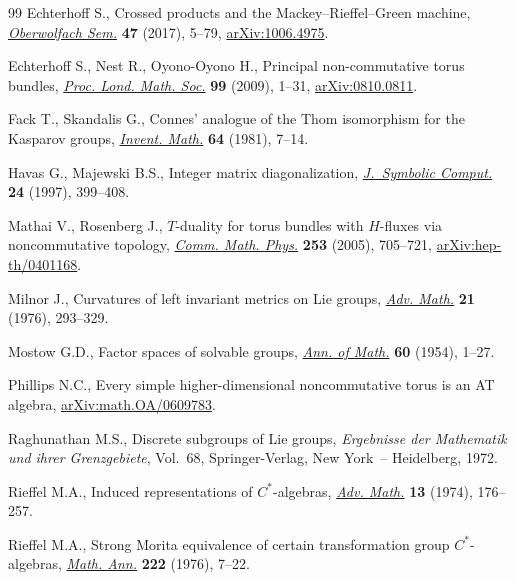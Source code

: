 \documentclass[11pt]{article}
\numberwithin{equation}{section}
\numberwithin{equation}{section}
\begin{document}
\begin{thebibliography}{99}
Echterhoff S., Crossed products and the Mackey--Rieffel--Green machine,
 \href{https://doi.org/10.1088/1126-6708/2003/09/054}{\textit{Oberwolfach Sem.}} \textbf{47} (2017), 5--79, \href{https://arxiv.org/abs/1006.4975}{arXiv:1006.4975}.

Echterhoff S., Nest R., Oyono-Oyono H., Principal non-commutative torus
 bundles, \href{https://doi.org/10.1112/plms/pdn050}{\textit{Proc. Lond. Math. Soc.}} \textbf{99} (2009), 1--31,
 \href{https://arxiv.org/abs/#2}{arXiv:0810.0811}.

Fack T., Skandalis G., Connes' analogue of the {T}hom isomorphism for the
 {K}asparov groups, \href{https://doi.org/10.1007/BF01393931}{\textit{Invent. Math.}} \textbf{64} (1981), 7--14.

Havas G., Majewski B.S., Integer matrix diagonalization, \href{https://doi.org/10.1006/jsco.1996.0141}{\textit{J.~Symbolic
 Comput.}} \textbf{24} (1997), 399--408.

Mathai V., Rosenberg J., {$T$}-duality for torus bundles with {$H$}-fluxes via
 noncommutative topology, \href{https://doi.org/10.1007/s00220-004-1159-7}{\textit{Comm. Math. Phys.}} \textbf{253} (2005),
 705--721, \href{https://arxiv.org/abs/hep-th/0401168}{arXiv:hep-th/0401168}.

Milnor J., Curvatures of left invariant metrics on {L}ie groups, \href{https://doi.org/10.1016/S0001-8708(76)80002-3}{\textit{Adv.
 Math.}} \textbf{21} (1976), 293--329.

Mostow G.D., Factor spaces of solvable groups, \href{https://doi.org/10.2307/1969700}{\textit{Ann. of Math.}}
 \textbf{60} (1954), 1--27.

Phillips N.C., Every simple higher-dimensional noncommutative torus is an AT
 algebra, \href{https://arxiv.org/abs/math.OA/0609783}{arXiv:math.OA/0609783}.

Raghunathan M.S., Discrete subgroups of {L}ie groups, \textit{Ergebnisse der
 Mathematik und ihrer Grenzgebiete}, Vol.~68, Springer-Verlag, New York~--
 Heidelberg, 1972.

Rieffel M.A., Induced representations of {$C^{\ast}$}-algebras, \href{https://doi.org/10.1016/0001-8708(74)90068-1}{\textit{Adv.
 Math.}} \textbf{13} (1974), 176--257.

Rieffel M.A., Strong {M}orita equivalence of certain transformation group
 {$C^*$}-algebras, \href{https://doi.org/10.1007/BF01418238}{\textit{Math. Ann.}} \textbf{222} (1976), 7--22.


\end{thebibliography}
\end{document}
